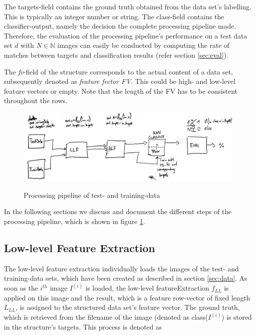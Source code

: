 \documentclass[10pt,twocolumn,letterpaper]{article}
\begin{document}
The targets-field contains the ground truth obtained from the data set's labelling. This is typically an integer number or string. The class-field contains the classifier-output, namely the decision the complete processing pipeline made. Therefore, the evaluation of the processing pipeline's performance on a test data set $d$ with $N \in \mathbb{N}$ images can easily be conducted by computing the rate of matches between targets and classification results (refer section \ref{sec:eval}).

The \emph{fv}-field of the structure corresponds to the actual content of a data set, subsequently denoted as \emph{feature fector FV}. This could be high- and low-level feature vectors or empty. Note that the length of the FV has to be consistent throughout the rows.


\begin{figure}
	\begin{center}
		

	\includegraphics[width=\linewidth]{img/pipeline}
	\label{fig:pipeline}
	\caption{Processing pipeline of test- and training-data}
		\end{center}
\end{figure}


In the following sections we discuss and document the different steps of the processing pipeline, which is shown in figure \ref{fig:pipeline}.

\subsection{Low-level Feature Extraction}
The low-level feature extraction individually loads the images of the test- and training-data sets, which have been created as described in section \ref{sec:data}. As soon as the $i^{th}$ image $I^{(i)}$ is loaded, the low-level featureExtraction $f_{LL}$ is applied on this image and the result, which is a feature row-vector of fixed length $L_{LL}$, is assigned to the structured data set's feature vector. The ground truth, which is retrieved from the filename of the image (denoted as class($I^{(i)}$) is stored in the structure's targets. This process is denoted as 
\end{document}
